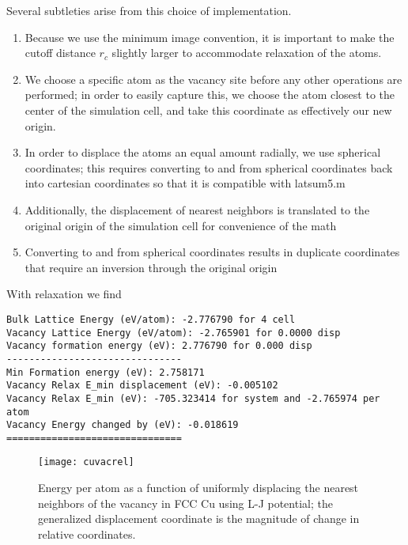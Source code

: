 \documentclass[12pt, oneside]{article}
\begin{document}
Several subtleties arise from this choice of implementation. 
\vspace{5mm}
 \begin{enumerate}
   \item Because we use the minimum image convention, it is important to make the cutoff distance $r_c$ slightly larger to accommodate relaxation of the atoms.
   \item We choose a specific atom as the vacancy site before any other operations are performed; in order to easily capture this, we choose the atom closest to the center of the simulation cell, and take this coordinate as effectively our new origin. 
   \item In order to displace the atoms an equal amount radially, we use spherical coordinates; this requires converting to and from spherical coordinates back into cartesian coordinates so that it is compatible with latsum5.m
   \item Additionally, the displacement of nearest neighbors is translated to the original origin of the simulation cell for convenience of the math
   \item Converting to and from spherical coordinates results in duplicate coordinates that require an inversion through the original origin
\end{enumerate}
\vspace{5mm}

With relaxation we find 

\begin{verbatim}
Bulk Lattice Energy (eV/atom): -2.776790 for 4 cell
Vacancy Lattice Energy (eV/atom): -2.765901 for 0.0000 disp
Vacancy formation energy (eV): 2.776790 for 0.000 disp 
-------------------------------
Min Formation energy (eV): 2.758171
Vacancy Relax E_min displacement (eV): -0.005102
Vacancy Relax E_min (eV): -705.323414 for system and -2.765974 per atom
Vacancy Energy changed by (eV): -0.018619
===============================

\end{verbatim}

\begin{figure}[htbp]
   \centering
   \texttt{[image: cuvacrel]} %
   \caption{Energy per atom as a function of uniformly displacing the nearest neighbors of the vacancy in FCC Cu using L-J potential; the generalized displacement coordinate is the magnitude of change in relative coordinates.}
   \label{fig:cuvacrel}
\end{figure}
\end{document}
